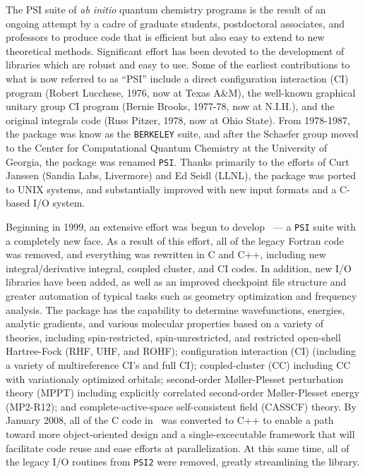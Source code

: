 %
%
%

The PSI suite of {\em ab initio} quantum chemistry programs is the result
of an ongoing attempt by a cadre of graduate students, postdoctoral
associates, and professors to produce code that is efficient but also
easy to extend to new theoretical methods.  Significant effort has been
devoted to the development of libraries which are robust and easy to use.
Some of the earliest contributions to what is now referred to as ``PSI''
include a direct configuration interaction (CI) program (Robert Lucchese,
1976, now at Texas A\&M), the well-known graphical unitary group CI program
(Bernie Brooks, 1977-78, now at N.I.H.), and the original integrals code
(Russ Pitzer, 1978, now at Ohio State).  From 1978-1987, the package was
know as the {\tt BERKELEY} suite, and after the Schaefer group moved to the
Center for Computational Quantum Chemistry at the University of Georgia,
the package was renamed {\tt PSI}.  Thanks primarily to the efforts of Curt
Janssen (Sandia Labs, Livermore) and Ed Seidl (LLNL), the package was
ported to UNIX systems, and substantially improved with new input formats
and a C-based I/O system.

Beginning in 1999, an extensive effort was begun to develop \PSIthree\
--- a {\tt PSI} suite with a completely new face.  As a result of this
effort, all of the legacy Fortran code was removed, and everything was
rewritten in C and C++, including new integral/derivative integral,
coupled cluster, and CI codes.  In addition, new I/O libraries have
been added, as well as an improved checkpoint file structure and greater
automation of typical tasks such as geometry optimization and frequency
analysis.  The package has the capability to determine wavefunctions,
energies, analytic gradients, and various molecular properties based on
a variety of theories, including spin-restricted, spin-unrestricted, and
restricted open-shell Hartree-Fock (RHF, UHF, and ROHF); configuration
interaction (CI) (including a variety of multireference CI's and full
CI); coupled-cluster (CC) including CC with variationaly optimized
orbitals; second-order M{\o}ller-Plesset perturbation theory (MPPT)
including explicitly correlated second-order M{\o}ller-Plesset energy
(MP2-R12); and complete-active-space self-consistent field (CASSCF)
theory.  By January 2008, all of the C code in \PSIthree\ was 
converted to C++ to enable a path toward more object-oriented design
and a single-excecutable framework that will facilitate code reuse and 
ease efforts at parallelization.  At this same time, all of the legacy I/O
routines from {\tt PSI2} were removed, greatly streamlining the
 library.
